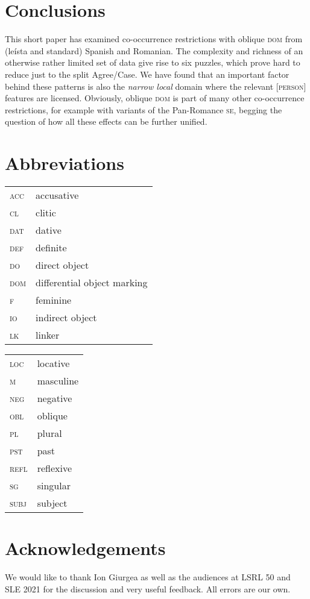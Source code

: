 \documentclass[output=paper,colorlinks,citecolor=brown,draft,draftmode]{langscibook}
\begin{document}
\section{Conclusions}\label{sec:irimia:ConclusionsSec6}

This short paper has examined co-occurrence restrictions with oblique \textsc{dom} from (leísta and standard) Spanish and Romanian. The complexity and richness of an otherwise rather limited set of data give rise to six puzzles, which prove hard to reduce just to the split Agree/Case. We have found that an important factor behind these patterns is also the \textit{narrow local} domain where the relevant [\textsc{person}] features are licensed. Obviously, oblique \textsc{dom} is part of many other co-occurrence restrictions, for example with variants of the Pan-Romance \textsc{se}, begging the question of how all these effects can be further unified.

\section*{Abbreviations}
\begin{tabularx}{.54\textwidth}{lQ}
\textsc{acc} & accusative  \\
\textsc{cl}& clitic  \\
\textsc{dat}&dative  \\
\textsc{def}&definite  \\
\textsc{do}&direct object  \\
\textsc{dom}&differential object marking   \\
\textsc{f}&feminine  \\
\textsc{io}&indirect object  \\
\textsc{lk}&linker  \\
\end{tabularx}
\begin{tabularx}{.45\textwidth}{lQ}
\textsc{loc}&locative  \\
\textsc{m}&masculine  \\
\textsc{neg}&negative  \\
\textsc{obl}&oblique  \\
\textsc{pl}&plural  \\
\textsc{pst}&past  \\
\textsc{refl}&reflexive  \\
\textsc{sg}&singular  \\
\textsc{subj}&subject  \\
\end{tabularx}

\section*{Acknowledgements}
We would like to thank Ion Giurgea as well as the audiences at LSRL 50 and SLE 2021 for the discussion and very useful feedback. All errors are our own.

\printbibliography[heading=subbibliography,notkeyword=this]
\end{document}
